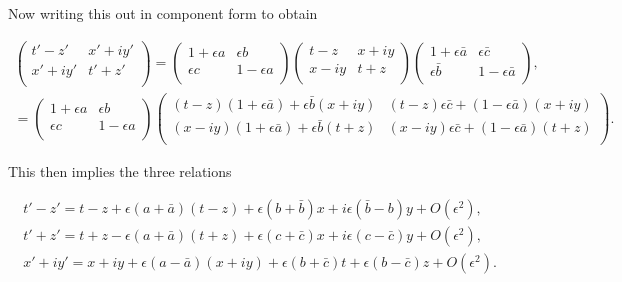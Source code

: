 \noindent Now writing this out in component form to obtain

\begin{eqnarray*}
\left(
\begin{array}{cc}
t'-z' & x' + iy' \\
x' + iy' & t'+z' \\
\end{array}
\right)
=
\left(
\begin{array}{cc}
1 + \epsilon a & \epsilon b \\
\epsilon c & 1 - \epsilon a \\
\end{array}
\right)
\left(
\begin{array}{cc}
t-z & x + iy \\
x - iy & t+z \\
\end{array}
\right)
\left(
\begin{array}{cc}
1 + \epsilon  \bar{a} & \epsilon \bar{c} \\
\epsilon \bar{b} & 1 - \epsilon \bar{a} \\
\end{array}
\right), \\
=
\left(
\begin{array}{cc}
1 + \epsilon a & \epsilon b \\
\epsilon c & 1 - \epsilon a \\
\end{array}
\right)
\left(
\begin{array}{cc}
(t-z)(1 + \epsilon \bar{a})+\epsilon \bar{b}(x + iy) & (t-z)\epsilon \bar{c}+ (1 - \epsilon \bar{a})(x + iy) \\
(x - iy)(1 + \epsilon \bar{a}) +\epsilon \bar{b} (t+z) & (x - iy)\epsilon \bar{c}+(1 - \epsilon \bar{a})(t+z) \\
\end{array}
\right).
\end{eqnarray*}

\noindent This then implies the three relations

\begin{eqnarray}\label{Infinitesimal_Lorentz_Transform_1}
t'-z' = t-z + \epsilon(a + \bar{a})(t-z) + \epsilon(b + \bar{b})x + i\epsilon(\bar{b} - b)y + O(\epsilon^2), \\\label{Infinitesimal_Lorentz_Transform_2}
t'+z' = t+ z - \epsilon(a + \bar{a})(t+z) + \epsilon (c + \bar{c})x + i \epsilon(c-\bar{c})y + O(\epsilon^2), \\\label{Infinitesimal_Lorentz_Transform_3}
x'+iy' = x+iy + \epsilon(a-\bar{a})(x+iy) + \epsilon(b + \bar{c})t + \epsilon (b-\bar{c})z + O(\epsilon^2).
\end{eqnarray}

